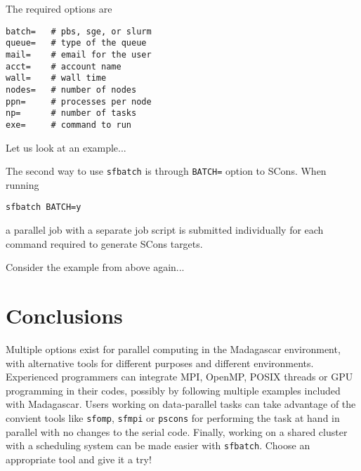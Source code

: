 The required options are
\begin{verbatim}
batch=   # pbs, sge, or slurm
queue=   # type of the queue
mail=    # email for the user
acct=    # account name
wall=    # wall time
nodes=   # number of nodes
ppn=     # processes per node
np=      # number of tasks
exe=     # command to run
\end{verbatim}

Let us look at an example...

The second way to use \texttt{sfbatch} is through \texttt{BATCH=} option to SCons. When running
\begin{verbatim}
sfbatch BATCH=y
\end{verbatim}
a parallel job with a separate job script is submitted individually
for each command required to generate SCons targets.

Consider the example from above again...

\section{Conclusions}

Multiple options exist for parallel computing in the Madagascar
environment, with alternative tools for different purposes and
different environments. Experienced programmers can integrate MPI,
OpenMP, POSIX threads or GPU programming in their codes, possibly by
following multiple examples included with Madagascar. Users working on
data-parallel tasks can take advantage of the convient tools like
\texttt{sfomp}, \texttt{sfmpi} or \texttt{pscons} for performing the
task at hand in parallel with no changes to the serial code. Finally,
working on a shared cluster with a scheduling system can be made
easier with \texttt{sfbatch}. Choose an appropriate tool and give it a try!





